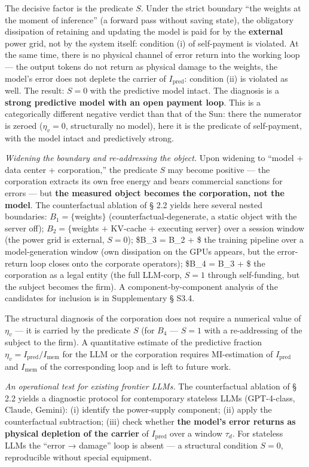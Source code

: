 \documentclass[pdflatex,sn-mathphys-ay]{sn-jnl}
\begin{document}
The decisive factor is the predicate \(S\). Under the strict boundary ``the weights at the moment of inference'' (a forward pass without saving state), the obligatory dissipation of retaining and updating the model is paid for by the \textbf{external} power grid, not by the system itself: condition (i) of self-payment is violated. At the same time, there is no physical channel of error return into the working loop --- the output tokens do not return as physical damage to the weights, the model's error does not deplete the carrier of \(I_{\text{pred}}\): condition (ii) is violated as well. The result: \(S = 0\) with the predictive model intact. The diagnosis is a \textbf{strong predictive model with an open payment loop}. This is a categorically different negative verdict than that of the Sun: there the numerator is zeroed (\(\eta_v = 0\), structurally no model), here it is the predicate of self-payment, with the model intact and predictively strong.

\emph{Widening the boundary and re-addressing the object.} Upon widening to ``model + data center + corporation,'' the predicate \(S\) may become positive --- the corporation extracts its own free energy and bears commercial sanctions for errors --- but \textbf{the measured object becomes the corporation, not the model}. The counterfactual ablation of § 2.2 yields here several nested boundaries: \(B_1 = \{\)weights\(\}\) (counterfactual-degenerate, a static object with the server off); \(B_2 = \{\)weights \(+\) KV-cache \(+\) executing server\(\}\) over a session window (the power grid is external, \(S = 0\)); \$B\_3 = B\_2 + \$ the training pipeline over a model-generation window (own dissipation on the GPUs appears, but the error-return loop closes onto the corporate operators); \$B\_4 = B\_3 + \$ the corporation as a legal entity (the full LLM-corp, \(S = 1\) through self-funding, but the subject becomes the firm). A component-by-component analysis of the candidates for inclusion is in Supplementary § S3.4.

The structural diagnosis of the corporation does not require a numerical value of \(\eta_v\) --- it is carried by the predicate \(S\) (for \(B_4\) --- \(S = 1\) with a re-addressing of the subject to the firm). A quantitative estimate of the predictive fraction \(\eta_v = I_{\text{pred}}/I_{\text{mem}}\) for the LLM or the corporation requires MI-estimation of \(I_{\text{pred}}\) and \(I_{\text{mem}}\) of the corresponding loop and is left to future work.

\emph{An operational test for existing frontier LLMs.} The counterfactual ablation of § 2.2 yields a diagnostic protocol for contemporary stateless LLMs (GPT-4-class, Claude, Gemini): (i) identify the power-supply component; (ii) apply the counterfactual subtraction; (iii) check whether \textbf{the model's error returns as physical depletion of the carrier} of \(I_{\text{pred}}\) over a window \(\tau_d\). For stateless LLMs the ``error → damage'' loop is absent --- a structural condition \(S = 0\), reproducible without special equipment.
\end{document}
